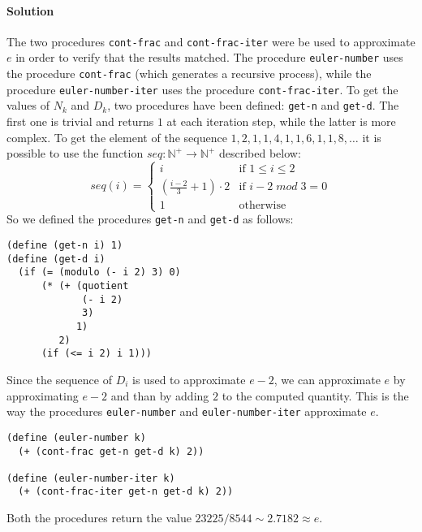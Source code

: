 \paragraph{Solution} 
The two procedures \texttt{cont-frac} and \texttt{cont-frac-iter} were be used to approximate $ e $ in order to verify that the 
results matched. The procedure \texttt{euler-number} uses the procedure \texttt{cont-frac} (which generates a recursive process), 
while the procedure \texttt{euler-number-iter} uses the procedure \texttt{cont-frac-iter}.
To get the values of $ N_{k} $ and $ D_{k} $, two procedures have been defined: \texttt{get-n} and \texttt{get-d}. The first one
is trivial and returns $ 1 $ at each iteration step, while the latter is more complex.
To get the element of the sequence $ 1, 2, 1, 1, 4, 1, 1, 6, 1, 1, 8, \dots $ it is possible to use the function
$ seq: \mathbb{N}^{+} \to \mathbb{N}^{+} $ described below:
\[     
  seq(i) = 
  \begin{cases}
      i & \text{if } 1 \leq i \leq 2 \\
      \left(\frac{i - 2}{3} + 1 \right) \cdot 2  & \text{if } i - 2\;mod\;3 = 0\\
      1 & \text{otherwise}
  \end{cases} 
\]
So we defined the procedures \texttt{get-n} and \texttt{get-d} as follows:
\begin{lstlisting}[caption={Definition of the procedures \texttt{get-n} and \texttt{get-d}}, captionpos=b]
(define (get-n i) 1)
(define (get-d i)
  (if (= (modulo (- i 2) 3) 0)
      (* (+ (quotient
             (- i 2)
             3)
            1)
         2)
      (if (<= i 2) i 1)))
\end{lstlisting}
Since the sequence of $ D_{i} $ is used to approximate $ e - 2 $, we can approximate $ e $ by approximating $ e - 2 $ and than
by adding $ 2 $ to the computed quantity. This is the way the procedures \texttt{euler-number} and \texttt{euler-number-iter}
approximate $ e $.
\begin{lstlisting}
(define (euler-number k)
  (+ (cont-frac get-n get-d k) 2))

(define (euler-number-iter k)
  (+ (cont-frac-iter get-n get-d k) 2))
\end{lstlisting}
Both the procedures return the value $ 23225 / 8544 \sim 2.7182 \approx e $.